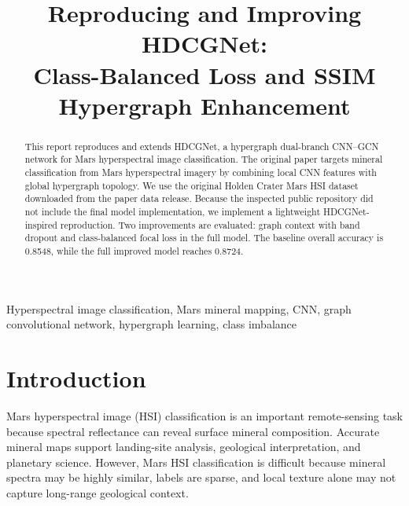\documentclass[conference]{IEEEtran}
\begin{document}
\title{
    Reproducing and Improving HDCGNet:\\
    Class-Balanced Loss and SSIM Hypergraph Enhancement
}

\author{
}

\maketitle

\begin{abstract}
This report reproduces and extends HDCGNet, a hypergraph dual-branch CNN--GCN network for Mars hyperspectral image classification. The original paper targets mineral classification from Mars hyperspectral imagery by combining local CNN features with global hypergraph topology. We use the original Holden Crater Mars HSI dataset downloaded from the paper data release. Because the inspected public repository did not include the final model implementation, we implement a lightweight HDCGNet-inspired reproduction. Two improvements are evaluated: graph context with band dropout and class-balanced focal loss in the full model. The baseline overall accuracy is 0.8548, while the full improved model reaches 0.8724.
\end{abstract}

\begin{IEEEkeywords}
Hyperspectral image classification, Mars mineral mapping, CNN, graph convolutional network, hypergraph learning, class imbalance
\end{IEEEkeywords}

\section{Introduction}
Mars hyperspectral image (HSI) classification is an important remote-sensing task because spectral reflectance can reveal surface mineral composition. Accurate mineral maps support landing-site analysis, geological interpretation, and planetary science. However, Mars HSI classification is difficult because mineral spectra may be highly similar, labels are sparse, and local texture alone may not capture long-range geological context.
\end{document}
